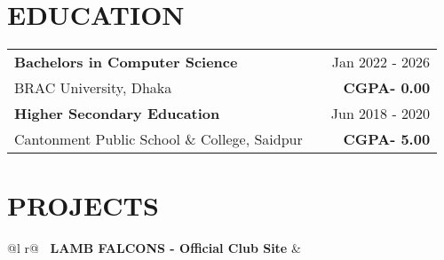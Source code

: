 \documentclass[a4paper,12pt]{article}
\begin{document}
\section{EDUCATION}
\begin{tabularx}{\linewidth}{@{}l X r@{}}
\textbf{Bachelors in Computer Science} & \hfill & Jan 2022 - 2026 \\
BRAC University, Dhaka & \hfill & \textbf{CGPA- 0.00} \\[15pt] 
\textbf{Higher Secondary Education} & \hfill & Jun 2018 - 2020 \\
Cantonment Public School \& College, Saidpur & \hfill & \textbf{CGPA- 5.00} \\
\end{tabularx}










  
\section{PROJECTS}

\begin{tabularx}{\linewidth}{ @{}l r@{} }
\textbf{\textbullet\ LAMB FALCONS - Official Club Site} & \hfill \href{https://lamb-falcons.vercel.app/}{\hspace{0.5em} \faLight\faLink} \\[3.75pt]
  \\
\end{tabularx}









\end{document}
